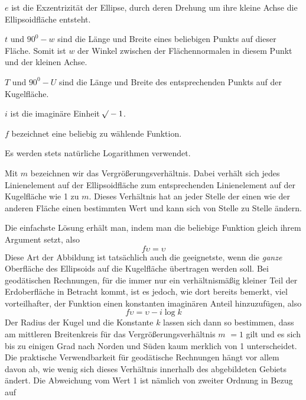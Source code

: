 \begin{list}{}{\setlength{\leftmargin}{1.5em}\setlength{\itemindent}{-1.5em}\setlength{\itemsep}{0pt}\setlength{\parsep}{0pt}}
\item \(e\) ist die Exzentrizität der Ellipse, durch deren Drehung um ihre kleine Achse die Ellipsoidfläche entsteht.
\item \(t\) und \(90^0-w\) sind die Länge und Breite eines beliebigen Punkts auf dieser Fläche. Somit ist \(w\) der Winkel zwischen der Flächennormalen in diesem Punkt und der kleinen Achse.
\item \(T\) und \(90^0-U\) sind die Länge und Breite des entsprechenden Punkts auf der Kugelfläche.
\item \(i\) ist die imaginäre Einheit \(\mathord{{}^{}\!\surd}-1\).
\item \(f\) bezeichnet eine beliebig zu wählende Funktion.
\end{list}
\noindent Es werden stets natürliche Logarithmen verwendet.\par
\noindent Mit \(m\) bezeichnen wir das Vergrößerungsverhältnis. Dabei verhält sich jedes Linienelement auf der Ellipsoidfläche zum entsprechenden Linienelement auf der Kugelfläche wie 1 zu \(m\). Dieses Verhältnis hat an jeder Stelle der einen wie der anderen Fläche einen bestimmten Wert und kann sich von Stelle zu Stelle ändern.

Die einfachste Lösung erhält man, indem man die beliebige Funktion gleich ihrem Argument setzt, also
\[
f\upsilon=\upsilon
\]
Diese Art der Abbildung ist tatsächlich auch die geeignetste, wenn die \textit{ganze} Oberfläche des Ellipsoids auf die Kugelfläche übertragen werden soll. Bei geodätischen Rechnungen, für die immer nur ein verhältnismäßig kleiner Teil der Erdoberfläche in Betracht kommt, ist es jedoch, wie dort bereits bemerkt, viel vorteilhafter, der Funktion einen konstanten imaginären Anteil hinzuzufügen, also
\[
f\upsilon=\upsilon-i\log k
\]
Der Radius der Kugel und die Konstante \(k\) lassen sich dann so bestimmen, dass am mittleren Breitenkreis für das Vergrößerungsverhältnis \(m\) \(=1\) gilt und es sich bis zu einigen Grad nach Norden und Süden kaum merklich von 1 unterscheidet. Die praktische Verwendbarkeit für geodätische Rechnungen hängt vor allem davon ab, wie wenig sich dieses Verhältnis innerhalb des abgebildeten Gebiets ändert. Die Abweichung vom Wert 1 ist nämlich von zweiter Ordnung in Bezug auf
